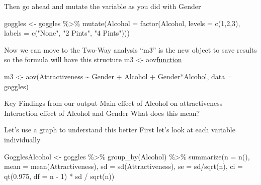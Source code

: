 \documentclass[
]{book}
\newenvironment{Shaded}{\begin{snugshade}}{\end{snugshade}}
\newcommand{\AttributeTok}[1]{\textcolor[rgb]{0.77,0.63,0.00}{#1}}
\newcommand{\DecValTok}[1]{\textcolor[rgb]{0.00,0.00,0.81}{#1}}
\newcommand{\FloatTok}[1]{\textcolor[rgb]{0.00,0.00,0.81}{#1}}
\newcommand{\FunctionTok}[1]{\textcolor[rgb]{0.00,0.00,0.00}{#1}}
\newcommand{\NormalTok}[1]{#1}
\newcommand{\OtherTok}[1]{\textcolor[rgb]{0.56,0.35,0.01}{#1}}
\newcommand{\SpecialCharTok}[1]{\textcolor[rgb]{0.00,0.00,0.00}{#1}}
\newcommand{\StringTok}[1]{\textcolor[rgb]{0.31,0.60,0.02}{#1}}
\begin{document}
Then go ahead and mutate the variable as you did with Gender

\begin{Shaded}
\begin{Highlighting}[]
\NormalTok{goggles }\OtherTok{\textless{}{-}}\NormalTok{ goggles }\SpecialCharTok{\%\textgreater{}\%} 
  \FunctionTok{mutate}\NormalTok{(}\AttributeTok{Alcohol =} \FunctionTok{factor}\NormalTok{(Alcohol, }\AttributeTok{levels =} \FunctionTok{c}\NormalTok{(}\DecValTok{1}\NormalTok{,}\DecValTok{2}\NormalTok{,}\DecValTok{3}\NormalTok{), }
            \AttributeTok{labels =} \FunctionTok{c}\NormalTok{(}\StringTok{"None"}\NormalTok{, }\StringTok{"2 Pints"}\NormalTok{, }\StringTok{"4 Pints"}\NormalTok{)))}
\end{Highlighting}
\end{Shaded}

Now we can move to the Two-Way analysis
``m3'' is the new object to save results so the formula will have this structure
m3 \textless- aov\href{Dependent\%20variable\%20~\%20Varible\%201\%20+\%20Variable\%202\%20+\%20Variable\%201*Variable\%202,\%20data\%20=\%20\%5Byour\%20dataset\%5D}{function}

\begin{Shaded}
\begin{Highlighting}[]
\NormalTok{m3 }\OtherTok{\textless{}{-}} \FunctionTok{aov}\NormalTok{(Attractiveness }\SpecialCharTok{\textasciitilde{}}\NormalTok{ Gender }\SpecialCharTok{+}\NormalTok{ Alcohol }\SpecialCharTok{+} 
\NormalTok{           Gender}\SpecialCharTok{*}\NormalTok{Alcohol, }\AttributeTok{data =}\NormalTok{ goggles)}
\end{Highlighting}
\end{Shaded}

Key Findings from our output
Main effect of Alcohol on attractiveness
Interaction effect of Alcohol and Gender
What does this mean?

Let's use a graph to understand this better
First let's look at each variable individually

\begin{Shaded}
\begin{Highlighting}[]
\NormalTok{GogglesAlcohol }\OtherTok{\textless{}{-}}\NormalTok{ goggles }\SpecialCharTok{\%\textgreater{}\%}
  \FunctionTok{group\_by}\NormalTok{(Alcohol) }\SpecialCharTok{\%\textgreater{}\%}
  \FunctionTok{summarize}\NormalTok{(}\AttributeTok{n =} \FunctionTok{n}\NormalTok{(),}
            \AttributeTok{mean =} \FunctionTok{mean}\NormalTok{(Attractiveness),}
            \AttributeTok{sd =} \FunctionTok{sd}\NormalTok{(Attractiveness),}
            \AttributeTok{se =}\NormalTok{ sd}\SpecialCharTok{/}\FunctionTok{sqrt}\NormalTok{(n),}
            \AttributeTok{ci =} \FunctionTok{qt}\NormalTok{(}\FloatTok{0.975}\NormalTok{, }\AttributeTok{df =}\NormalTok{ n }\SpecialCharTok{{-}} \DecValTok{1}\NormalTok{) }\SpecialCharTok{*}\NormalTok{ sd }\SpecialCharTok{/} \FunctionTok{sqrt}\NormalTok{(n))}
\end{Highlighting}
\end{Shaded}
\end{document}
